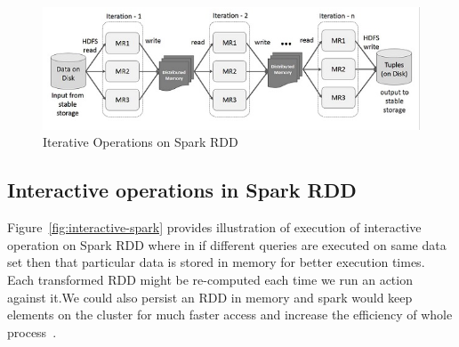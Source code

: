 


\begin{figure}[!ht]
  \centering\includegraphics[width=\columnwidth]{images/iterativeSpark.png}
   \caption{Iterative Operations on Spark RDD
   ~\cite{hid-sp18-410-spark-RDD}}\label{fig:iterative-spark}
\end{figure}



\subsection{Interactive operations in Spark RDD}

Figure~\ref{fig:interactive-spark} provides illustration of execution of 
interactive operation on Spark RDD where in if different queries are executed on
 same data set then that particular data is stored in memory for better 
 execution times. Each transformed RDD might be re-computed each time we run an 
 action against it.We could also persist an RDD in memory and spark would keep 
 elements on the cluster for much faster access and increase the efficiency of 
 whole process~\cite{hid-sp18-410-spark-RDD}.





